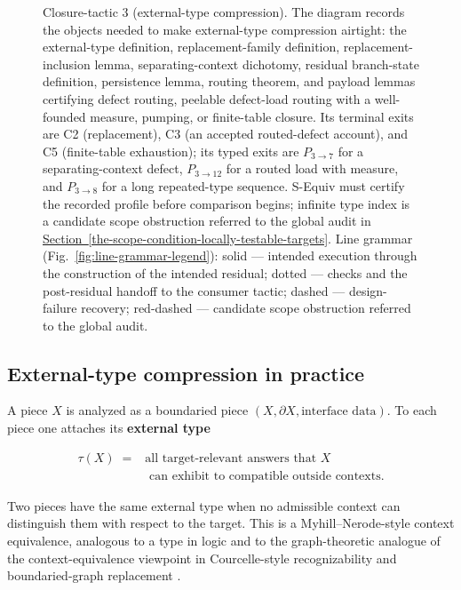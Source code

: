 \documentclass[
  11pt,
]{article}
\theoremstyle{definition}
\newcommand{\secref}[1]{\hyperref[#1]{Section~\ref*{#1}}}
\begin{document}
\begin{figure}[p]
{%
}
\caption[Closure-tactic 3: external-type compression]{Closure-tactic 3 (external-type compression).  The diagram records the objects needed to make external-type compression airtight: the external-type definition, replacement-family definition, replacement-inclusion lemma, separating-context dichotomy, residual branch-state definition, persistence lemma, routing theorem, and payload lemmas certifying defect routing, peelable defect-load routing with a well-founded measure, pumping, or finite-table closure.  Its terminal exits are C2 (replacement), C3 (an accepted routed-defect account), and C5 (finite-table exhaustion); its typed exits are \(P_{3\to7}\) for a separating-context defect, \(P_{3\to12}\) for a routed load with measure, and \(P_{3\to8}\) for a long repeated-type sequence.  S-Equiv must certify the recorded profile before comparison begins; infinite type index is a candidate scope obstruction referred to the global audit in \secref{the-scope-condition-locally-testable-targets}.  Line grammar (Fig.~\ref{fig:line-grammar-legend}): solid --- intended execution through the construction of the intended residual; dotted --- checks and the post-residual handoff to the consumer tactic; dashed --- design-failure recovery; red-dashed --- candidate scope obstruction referred to the global audit.}
\label{fig:ct3-external-type-compression}
\end{figure}
\FloatBarrier

\subsection*{External-type compression in practice}

A piece \(X\) is analyzed as a boundaried piece
\((X,\partial X,\text{interface data})\). To each piece one attaches its
\textbf{external type}

\[
\begin{aligned}
\tau(X) \;={}& \text{all target-relevant answers that } X\\
&\text{ can exhibit to compatible outside contexts}.
\end{aligned}
\]

Two pieces have the same external type when no admissible context can
distinguish them with respect to the target. This is a Myhill--Nerode-style
context equivalence, analogous to a type in logic and to the
graph-theoretic analogue of the context-equivalence viewpoint in
Courcelle-style recognizability and boundaried-graph replacement
\citep{myhill-1957-automata, nerode-1958-linear, courcelle-1990-mso-graphs, courcelle-engelfriet-2012-graph-structure, bodlaender-etal-2009-meta-kernelization}.
\end{document}
